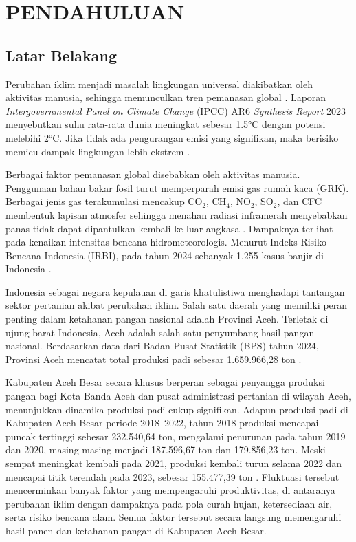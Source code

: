 
\chapter{PENDAHULUAN}

\section{Latar Belakang}
    Perubahan iklim menjadi masalah lingkungan universal diakibatkan oleh aktivitas manusia, sehingga memunculkan tren pemanasan global \citep{rahmayanti2022}. Laporan \textit{Intergovernmental Panel on Climate Change} (IPCC) AR6 \textit{Synthesis Report} 2023 menyebutkan suhu rata-rata dunia meningkat sebesar 1.5°C dengan potensi melebihi 2°C. Jika tidak ada pengurangan emisi yang signifikan, maka berisiko memicu dampak lingkungan lebih ekstrem \citep{ipcc2023}. 
    
    Berbagai faktor pemanasan global disebabkan oleh aktivitas manusia. Penggunaan bahan bakar fosil turut memperparah emisi gas rumah kaca (GRK). Berbagai jenis gas terakumulasi mencakup CO$_2$, CH$_4$, NO$_2$, SO$_2$, dan CFC membentuk lapisan atmosfer sehingga menahan radiasi inframerah menyebabkan panas tidak dapat dipantulkan kembali ke luar angkasa \citep{azadi2021}. Dampaknya terlihat pada kenaikan intensitas bencana hidrometeorologis. Menurut Indeks Risiko Bencana Indonesia (IRBI), pada tahun 2024 sebanyak 1.255 kasus banjir di Indonesia \citep{bnpb2025}.
        
    Indonesia sebagai negara kepulauan di garis khatulistiwa menghadapi tantangan sektor pertanian akibat perubahan iklim. Salah satu daerah yang memiliki peran penting dalam ketahanan pangan nasional adalah Provinsi Aceh. Terletak di ujung barat Indonesia, Aceh adalah salah satu penyumbang hasil pangan nasional. Berdasarkan data dari Badan Pusat Statistik (BPS) tahun 2024, Provinsi Aceh mencatat total produksi padi sebesar 1.659.966,28 ton \citep{bpsindonesia2024}.

    Kabupaten Aceh Besar secara khusus berperan sebagai penyangga produksi pangan bagi Kota Banda Aceh dan pusat administrasi pertanian di wilayah Aceh, menunjukkan dinamika produksi padi cukup signifikan. Adapun produksi padi di Kabupaten Aceh Besar periode 2018–2022, tahun 2018 produksi mencapai puncak tertinggi sebesar 232.540,64 ton, mengalami penurunan pada tahun 2019 dan 2020, masing-masing menjadi 187.596,67 ton dan 179.856,23 ton. Meski sempat meningkat kembali pada 2021, produksi kembali turun selama 2022 dan mencapai titik terendah pada 2023, sebesar 155.477,39 ton \citep{bpsaceh2022-2018}. Fluktuasi tersebut mencerminkan banyak faktor yang mempengaruhi produktivitas, di antaranya perubahan iklim dengan dampaknya pada pola curah hujan, ketersediaan air, serta risiko bencana alam. Semua faktor tersebut secara langsung memengaruhi hasil panen dan ketahanan pangan di Kabupaten Aceh Besar.

